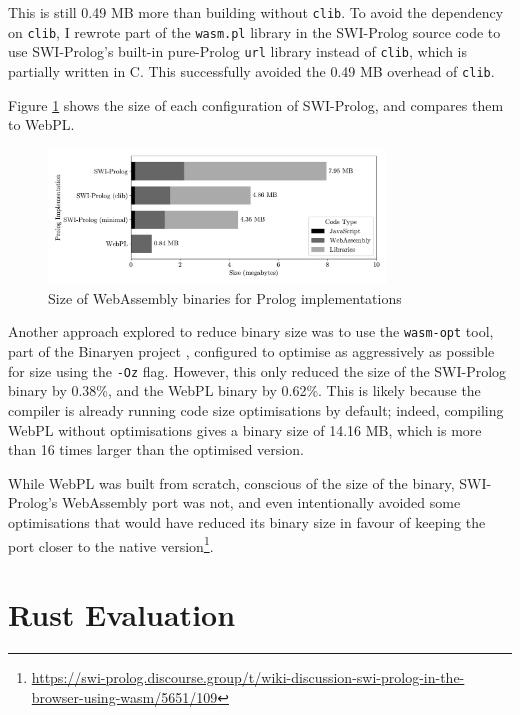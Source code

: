 This is still 0.49 MB more than building without \texttt{clib}. To avoid the dependency on \texttt{clib}, I rewrote part of the \texttt{wasm.pl} library in the SWI-Prolog source code to use SWI-Prolog's built-in pure-Prolog \texttt{url} library instead of \texttt{clib}, which is partially written in C. This successfully avoided the 0.49 MB overhead of \texttt{clib}.

Figure \ref{fig:binary-size} shows the size of each configuration of SWI-Prolog, and compares them to WebPL.

\begin{figure}[H]
\centering
\includegraphics[width=0.8\textwidth]{binary_size.pdf}
\caption{Size of WebAssembly binaries for Prolog implementations}
\label{fig:binary-size}
\end{figure}

Another approach explored to reduce binary size was to use the \texttt{wasm-opt} tool, part of the Binaryen project \cite{zakaiBinaryenhttpsgithubcom2015}, configured to optimise as aggressively as possible for size using the \texttt{-Oz} flag. However, this only reduced the size of the SWI-Prolog binary by 0.38\%, and the WebPL binary by 0.62\%. This is likely because the compiler is already running code size optimisations by default; indeed, compiling WebPL without optimisations gives a binary size of 14.16 MB, which is more than 16 times larger than the optimised version.

While WebPL was built from scratch, conscious of the size of the binary, SWI-Prolog's WebAssembly port was not, and even intentionally avoided some optimisations that would have reduced its binary size in favour of keeping the port closer to the native version\footnote{\url{https://swi-prolog.discourse.group/t/wiki-discussion-swi-prolog-in-the-browser-using-wasm/5651/109}}.

\section{Rust Evaluation}

\label{sec:rust-evaluation}

